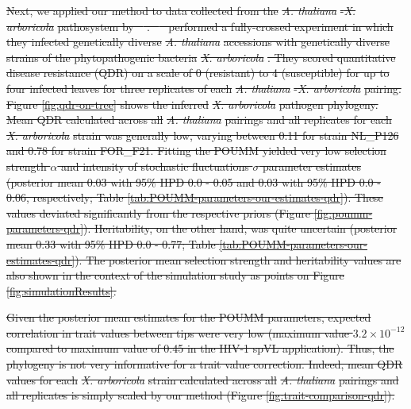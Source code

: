 \documentclass[12pt]{article} %
\providecommand{\DIFdel}[1]{{\protect\color{red}\sout{#1}}}                      %
\begin{document}
\begin{doublespace}
\DIFdel{Next, we applied our method to data collected from the }\emph{\DIFdel{A. thaliana}}%
\DIFdel{-}\emph{\DIFdel{X. arboricola}} %
\DIFdel{pathosystem by \mbox{%
\cite{Wang2018Two-wayGenomes}}\hskip0pt%
. \mbox{%
\cite{Wang2018Two-wayGenomes} }\hskip0pt%
performed a fully-crossed experiment in which they infected genetically diverse }\emph{\DIFdel{A. thaliana}} %
\DIFdel{accessions with genetically diverse strains of the phytopathogenic bacteria }\emph{\DIFdel{X. arboricola}}%
\DIFdel{. They scored quantitative disease resistance (QDR) on a scale of 0 (resistant) to 4 (susceptible) for up to four infected leaves for three replicates of each }\emph{\DIFdel{A. thaliana}}%
\DIFdel{-}\emph{\DIFdel{X. arboricola}} %
\DIFdel{pairing. Figure \ref{fig:qdr-on-tree} shows the inferred }\emph{\DIFdel{X. arboricola}} %
\DIFdel{pathogen phylogeny. Mean QDR calculated across all }\emph{\DIFdel{A. thaliana}} %
\DIFdel{pairings and all replicates for each }\emph{\DIFdel{X. arboricola}} %
\DIFdel{strain was generally low, varying between 0.11 for strain NL\_P126 and 0.78 for strain FOR\_F21. Fitting the POUMM yielded very low selection strength $\alpha$ and intensity of stochastic fluctuations  $\sigma$ parameter estimates (posterior mean 0.03 with 95\% HPD 0.0 - 0.05 and 0.03 with 95\% HPD 0.0 - 0.06, respectively; Table \ref{tab:POUMM-parameters-our-estimates-qdr}). These values deviated significantly from the respective priors (Figure \ref{fig:poumm-parameters-qdr}). Heritability, on the other hand, was quite uncertain (posterior mean 0.33 with 95\% HPD 0.0 - 0.77; Table \ref{tab:POUMM-parameters-our-estimates-qdr}). The posterior mean selection strength and heritability values are also shown in the context of the simulation study as points on Figure \ref{fig:simulationResults}.
}%

\DIFdel{Given the posterior mean estimates for the POUMM parameters, expected correlation in trait values between tips were very low (maximum value $3.2 \times 10^{-12}$ compared to maximum value of 0.45 in the HIV-1 spVL application). Thus, the phylogeny is not very informative for a trait value correction. Indeed, mean QDR values for each }\emph{\DIFdel{X. arboricola}} %
\DIFdel{strain calculated across all }\emph{\DIFdel{A. thaliana}} %
\DIFdel{pairings and all replicates is simply scaled by our method (Figure \ref{fig:trait-comparison-qdr}).
}%


\end{doublespace}
\end{document}

